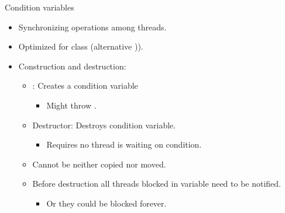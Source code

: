 \begin{frame}{Condition variables}
\begin{itemize}
  \item Synchronizing operations among threads.
  \item Optimized for class  (alternative )).
  \item Construction and destruction:
    \begin{itemize}
      \item {}: Creates a condition variable
        \begin{itemize}
          \item Might throw .
        \end{itemize}
      \item Destructor: Destroys condition variable.
        \begin{itemize}
         \item Requires no thread is waiting on condition.
        \end{itemize}
      \item Cannot be neither copied nor moved.
      \item Before destruction all threads blocked in variable need to be notified.
        \begin{itemize}
          \item Or they could be blocked forever.
        \end{itemize}
    \end{itemize}
\end{itemize}
\end{frame}

